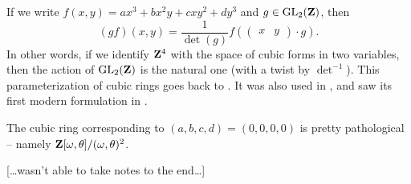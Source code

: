 If we write $f(x,y) = a x^3 + b x^2 y + c xy^2 + d y^3$ and 
$g\in \operatorname{GL}_2(\mathbf{Z})$, then 
\[
  (g f)(x,y) = \frac{1}{\det(g)} f\left(\begin{pmatrix} x & y \end{pmatrix} \cdot g\right) .
\]
In other words, if we identify $\mathbf{Z}^4$ with the space of cubic forms in 
two variables, then the action of $\operatorname{GL}_2(\mathbf{Z})$ is the natural one 
(with a twist by $\det^{-1}$). 
This parameterization of cubic rings goes back to \cite{df64}. It was also 
used in \cite{dh69}, and saw its first modern formulation in 
\cite{ggs02}. 

\begin{example}
The cubic ring corresponding to $(a,b,c,d)=(0,0,0,0)$ is pretty pathological -- 
namely $\mathbf{Z}[\omega,\theta]/(\omega,\theta)^2$. 
\end{example}

[\ldots wasn't able to take notes to the end\ldots]





